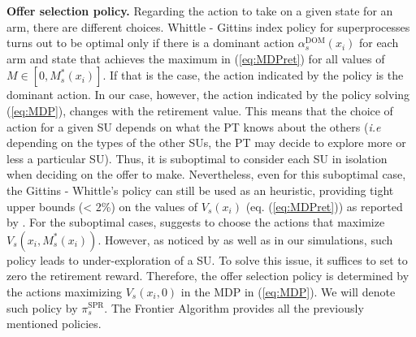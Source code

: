\textbf{Offer selection policy.} Regarding the action to take on a given state for an arm, there are different choices.
Whittle - Gittins index policy for superprocesses turns out to be optimal only if there is a dominant action $\alpha_s^{\text{DOM}}(x_i)$ for each arm and state that achieves the maximum in (\ref{eq:MDPret}) for all values of $M \in [0,M_s^*(x_i)]$. 
If that is the case, the action indicated by the policy is the dominant action. In our case, however, the action indicated by the policy solving (\ref{eq:MDP}), changes with the retirement value. 
This means that the choice of action for a given SU depends on what the PT knows about the others (\textit{i.e} depending on the types of the other SUs, the PT may decide to explore more or less a particular SU). Thus, it is suboptimal to consider each SU in isolation when deciding on the offer to make.
Nevertheless, even for this suboptimal case, the Gittins - Whittle's policy can still be used as an heuristic, providing tight upper bounds (< 2\%) on the values of $V_s(x_i)$ (eq. (\ref{eq:MDPret})) as reported by \cite{ref:Brown2013}.
For the suboptimal cases, \cite{ref:Pandey2007} suggests to choose the actions that maximize $V_s(x_i, M_s^*(x_i))$. 
However, as noticed by \cite{ref:Brown2013} as well as in our simulations, such policy leads to under-exploration of a SU. To solve this issue, it suffices to set to zero the retirement reward. Therefore, the offer selection policy is determined by the actions maximizing $V_s(x_i,0)$ in the MDP in (\ref{eq:MDP}). We will denote such policy by $\pi_s^{\text{SPR}}$. The Frontier Algorithm provides all the previously mentioned policies. 

